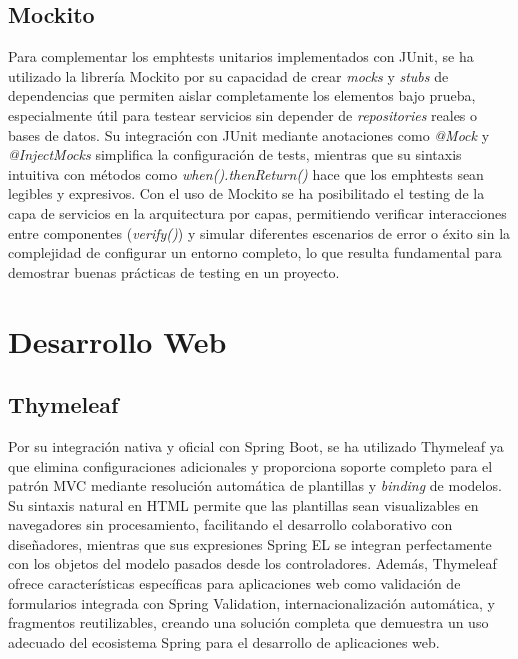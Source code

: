 \subsection{Mockito}\label{mockito}
Para complementar los emph{tests} unitarios implementados con JUnit, se ha utilizado la librería Mockito por su capacidad de crear \emph{mocks} y \emph{stubs} de dependencias que permiten aislar completamente los elementos bajo prueba, especialmente útil para testear servicios sin depender de \emph{repositories} reales o bases de datos. Su integración con JUnit mediante anotaciones como \emph{@Mock} y \emph{@InjectMocks} simplifica la configuración de tests, mientras que su sintaxis intuitiva con métodos como \emph{when().thenReturn()} hace que los emph{tests} sean legibles y expresivos. Con el uso de Mockito se ha posibilitado el testing de la capa de servicios en la arquitectura por capas, permitiendo verificar interacciones entre componentes (\emph{verify()}) y simular diferentes escenarios de error o éxito sin la complejidad de configurar un entorno completo, lo que resulta fundamental para demostrar buenas prácticas de testing en un proyecto.

\section{Desarrollo Web}\label{desarrollo-web}

\subsection{Thymeleaf}\label{thymeleaf}
Por su integración nativa y oficial con Spring Boot, se ha utilizado Thymeleaf ya que elimina configuraciones adicionales y proporciona soporte completo para el patrón MVC mediante resolución automática de plantillas y \emph{binding} de modelos. Su sintaxis natural en HTML permite que las plantillas sean visualizables en navegadores sin procesamiento, facilitando el desarrollo colaborativo con diseñadores, mientras que sus expresiones Spring EL se integran perfectamente con los objetos del modelo pasados desde los controladores. Además, Thymeleaf ofrece características específicas para aplicaciones web como validación de formularios integrada con Spring Validation, internacionalización automática, y fragmentos reutilizables, creando una solución completa que demuestra un uso adecuado del ecosistema Spring para el desarrollo de aplicaciones web.

